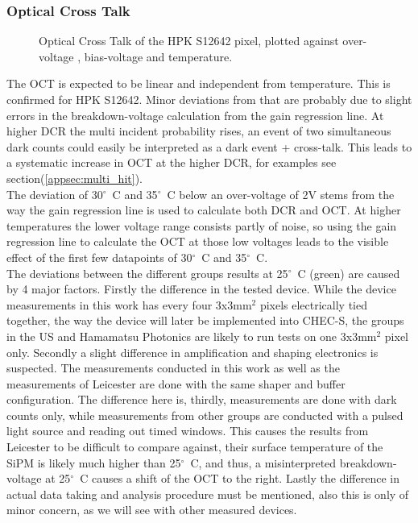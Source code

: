 \documentclass[12pt,article,type=msc,colorback,accentcolor=tud9c]{tudthesis}
\begin{document}
\subsubsection{Optical Cross Talk}
\begin{figure}[h]
\begin{centering}
\caption[CHEC-S OCT]{Optical Cross Talk of the HPK S12642 pixel, plotted against over-voltage , bias-voltage and temperature.}
\label{fig:S12642_OCT}
\end{centering}
\end{figure}
The OCT is expected to be linear and independent from temperature. This is confirmed for HPK S12642. Minor deviations from that are probably due to slight errors in the breakdown-voltage calculation from the gain regression line. At higher DCR the multi incident probability rises, an event of two simultaneous dark counts could easily be interpreted as a dark event + cross-talk. This leads to a systematic increase in OCT at the higher DCR, for examples see section(\ref{appsec:multi_hit}).\\
The deviation of 30${^\circ}$~C and 35${^\circ}$~C below an over-voltage of 2V stems from the way the gain regression line is used to calculate both DCR and OCT. At higher temperatures the lower voltage range consists partly of noise, so using the gain regression line to calculate the OCT at those low voltages leads to the visible effect of the first few datapoints of 30${^\circ}$~C and 35${^\circ}$~C. \\
The deviations between the different groups results at 25${^\circ}$~C (green) are caused by 4 major factors. Firstly the difference in the tested device. While the device measurements in this work has every four 3x3mm$^2$ pixels electrically tied together, the way the device will later be implemented into CHEC-S, the groups in the US\cite{US_CHECS} and Hamamatsu Photonics\cite{HPK_SiPM} are likely to run tests on one 3x3mm$^2$ pixel only. Secondly a slight difference in amplification and shaping electronics is suspected. The measurements conducted in this work as well as the measurements of Leicester are done with the same shaper and buffer configuration. The difference here is, thirdly, measurements are done with dark counts only, while measurements from other groups are conducted with a pulsed light source and reading out timed windows. This causes the results from Leicester to be difficult to compare against, their surface temperature of the SiPM is likely much higher than 25${^\circ}$~C, and thus, a misinterpreted breakdown-voltage at 25${^\circ}$~C causes a shift of the OCT to the right. Lastly the difference in actual data taking and analysis procedure must be mentioned, also this is only of minor concern, as we will see with other measured devices.
\end{document}

